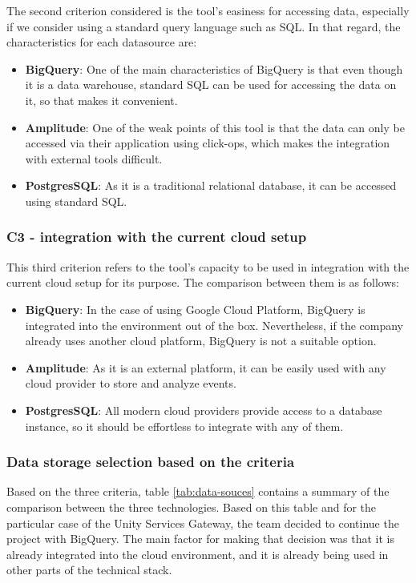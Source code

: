 \documentclass[english, 12pt, a4paper, sci, utf8, a-1b, online]{aaltothesis}
\begin{document}
The second criterion considered is the tool's easiness for accessing data, especially if we consider using a standard query language such as SQL. In that regard, the characteristics for each datasource are:
\begin{itemize}
    \item \textbf{BigQuery}: One of the main characteristics of BigQuery is that even though it is a data warehouse, standard SQL can be used for accessing the data on it, so that makes it convenient.
    \item \textbf{Amplitude}: One of the weak points of this tool is that the data can only be accessed via their application using click-ops, which makes the integration with external tools difficult.
    \item \textbf{PostgresSQL}: As it is a traditional relational database, it can be accessed using standard SQL.
\end{itemize}

\subsubsection*{C3 - integration with the current cloud setup}

This third criterion refers to the tool's capacity to be used in integration with the current cloud setup for its purpose. The comparison between them is as follows:

\begin{itemize}
    \item \textbf{BigQuery}: In the case of using Google Cloud Platform, BigQuery is integrated into the environment out of the box. Nevertheless, if the company already uses another cloud platform, BigQuery is not a suitable option.
    \item \textbf{Amplitude}: As it is an external platform, it can be easily used with any cloud provider to store and analyze events. 
    \item \textbf{PostgresSQL}: All modern cloud providers provide access to a database instance, so it should be effortless to integrate with any of them. 
\end{itemize}

\subsubsection*{Data storage selection based on the criteria}

Based on the three criteria, table \ref{tab:data-souces} contains a summary of the comparison between the three technologies. Based on this table and for the particular case of the Unity Services Gateway, the team decided to continue the project with BigQuery. The main factor for making that decision was that it is already integrated into the cloud environment, and it is already being used in other parts of the technical stack.\\
\end{document}
